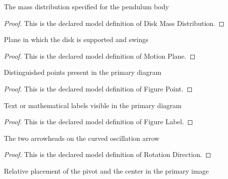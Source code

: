 \begin{definition}
  \label{def:physics:phyx-mini-0264:phyxminiproblems-problemphyxmini0264-diskmassdistribution}
  The mass distribution specified for the pendulum body
\end{definition}
\begin{proof}
  This is the declared model definition of Disk Mass Distribution.
\end{proof}
\begin{definition}
  \label{def:physics:phyx-mini-0264:phyxminiproblems-problemphyxmini0264-motionplane}
  Plane in which the disk is supported and swings
\end{definition}
\begin{proof}
  This is the declared model definition of Motion Plane.
\end{proof}
\begin{definition}
  \label{def:physics:phyx-mini-0264:phyxminiproblems-problemphyxmini0264-figurepoint}
  Distinguished points present in the primary diagram
\end{definition}
\begin{proof}
  This is the declared model definition of Figure Point.
\end{proof}
\begin{definition}
  \label{def:physics:phyx-mini-0264:phyxminiproblems-problemphyxmini0264-figurelabel}
  Text or mathematical labels visible in the primary diagram
\end{definition}
\begin{proof}
  This is the declared model definition of Figure Label.
\end{proof}
\begin{definition}
  \label{def:physics:phyx-mini-0264:phyxminiproblems-problemphyxmini0264-rotationdirection}
  The two arrowheads on the curved oscillation arrow
\end{definition}
\begin{proof}
  This is the declared model definition of Rotation Direction.
\end{proof}
\begin{definition}
  \label{def:physics:phyx-mini-0264:phyxminiproblems-problemphyxmini0264-pivotplacement}
  Relative placement of the pivot and the center in the primary image
\end{definition}
